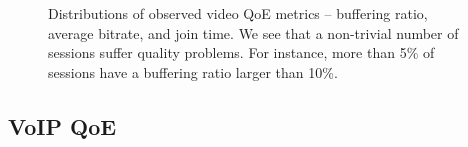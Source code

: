 \begin{figure}[t]
\centering
\captionsetup[subfigure]{justification=centering,farskip=-1pt,captionskip=5pt}
\caption{Distributions of observed video QoE metrics -- 
buffering ratio, average bitrate, and join time. 
 We see that a non-trivial number of sessions suffer quality problems. 
 For instance, more than 5\% of sessions have a buffering ratio larger
  than 10\%.  }
\label{fig:overview:qualitycdf}
\end{figure}



\subsection{VoIP QoE}
\label{subsec:related:voip-qoe}

\newcommand{\Call}{\ensuremath{c}\xspace}
\newcommand{\CallSet}{\ensuremath{C}\xspace}
\newcommand{\Relay}{\ensuremath{r}\xspace}
\newcommand{\RelaySet}{\ensuremath{R}\xspace}
\newcommand{\QualityFunc}{\ensuremath{Q}\xspace}
\newcommand{\HistoryCallSet}{\ensuremath{H}\xspace}
\newcommand{\Assign}{{\sf\small Assign}\xspace}
\newcommand{\Budget}{\ensuremath{B}\xspace}
\newcommand{\Predictor}{{\sf\small Pred}\xspace}
\newcommand{\BuildPredictor}{{\sf\small BuildPredictor}\xspace}
\newcommand{\GetTopK}{{\sf\small GetTopK}\xspace}
\newcommand{\Explore}{{\sf\small Explore}\xspace}
\newcommand{\Src}{\ensuremath{s}\xspace}
\newcommand{\Dst}{\ensuremath{d}\xspace}

